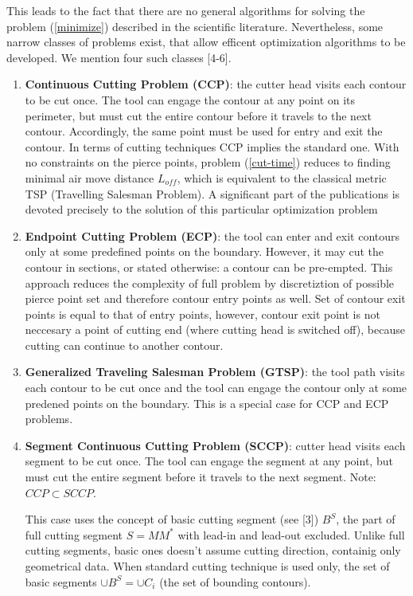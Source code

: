 \documentclass{../download/tPRS2e}
\begin{document}
This leads to the fact that
there are no general algorithms for solving the problem (\ref{minimize})
described in the scientific literature. 
Nevertheless,
some narrow classes of problems
exist,
that allow efficent optimization algorithms to be developed.
We mention four such classes [4-6].

\begin{enumerate}
    \item{\textbf{Continuous Cutting Problem (CCP)}}:
    the cutter head visits each contour to be cut once.
    The tool can engage the contour at any point on its perimeter,
    but must cut the entire
    contour before it travels to the next contour.
    Accordingly, the same point must be used for
    entry and exit the contour.
    In terms of cutting techniques CCP implies the standard one.
    With no constraints on the pierce points,
    problem (\ref{cut-time}) reduces to finding minimal
    air move distance $L_{off}$,
    which is equivalent to the classical metric TSP
    (Travelling Salesman Problem).
    A significant part of the publications is devoted precisely
    to the solution of this particular optimization problem
    \item{\textbf{Endpoint Cutting Problem (ECP)}}:
    the tool can enter and exit contours only at some
    predefined points on the boundary.
    However, it may cut the contour in sections,
    or stated otherwise: a contour can be pre-empted.
    This approach reduces the complexity of full problem
    by discretiztion of possible pierce point set and therefore
    contour entry points as well.
    Set of contour exit points is equal to that of
    entry points, however,
    contour exit point is not neccesary
    a point of cutting end 
    (where cutting head is switched off),
    because cutting can continue to another contour.
    \item{\textbf{Generalized Traveling Salesman Problem (GTSP)}}:
    the tool path visits each contour to be cut once
    and the tool can engage the contour only
    at some predened points on the boundary.
    This is a special case for CCP and ECP problems.
    \item{\textbf{Segment Continuous Cutting Problem (SCCP)}}:
    cutter head visits each segment to be cut once.
    The tool can engage the segment at any point,
    but must cut the entire segment before it travels to the next segment.
    Note: $CCP \subset SCCP$.

    This case uses the concept of basic cutting segment
    (see [3])
    $B^S$, the part of full cutting segment
    $S = MM^*$ with lead-in and lead-out excluded.
    Unlike full cutting segments,
    basic ones doesn't assume cutting direction,
    containig only geometrical data.
    When standard cutting technique is used only,
    the set of basic segments $\cup B^S = \cup C_i$
    (the set of bounding contours).
\end{enumerate}
\end{document}
